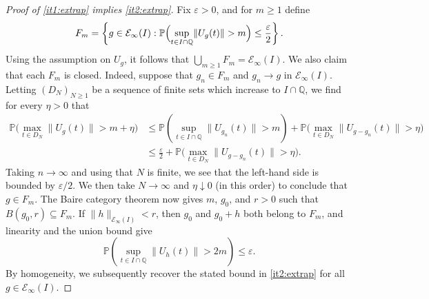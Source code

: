 \documentclass[11pt]{amsart}
\theoremstyle{definition}
\theoremstyle{remark}
\numberwithin{equation}{section}
\renewcommand{\P}{\mathbb P}
\newcommand{\Q}{\mathbb Q}
\newcommand{\1}{\mathbf 1}
\newcommand{\norm}[1]{\lVert #1\rVert}
\begin{document}
\begin{proof}[Proof of \ref{it1:extrap} implies \ref{it2:extrap}]
Fix $\varepsilon > 0$, and for $m \geq 1$ define
\[
 F_m=\left\{g\in\mathcal E_\infty(I):
  \P\Bigl(\sup_{t \in I \cap \Q} \norm{U_g(t)}>m \Bigr)\leq\frac\varepsilon2\right\}.
\]
Using the assumption on $U_g$, it follows that $\bigcup_{m \geq 1} F_m = \mathcal E_\infty(I)$.
We also claim that each \(F_m\) is closed.  Indeed, suppose that
\(g_n\in F_m\) and \(g_n\to g\) in \(\mathcal E_\infty(I)\). Letting $(D_N)_{N\geq 1}$ be a sequence of finite sets which increase to $I \cap \Q$, we find for every $\eta > 0$ that
\[
 \begin{split}
 \P\Big(
  \max_{t\in D_N}\norm{U_g(t)}>m+\eta
 \Big)
 &\leq
 \P(\sup_{t \in I \cap \Q} \norm{U_{g_n}(t)}>m)
 +\P\Big(
   \max_{t\in D_N}\norm{U_{g - g_n}(t)}>\eta
  \Big) \\
  &\leq
 \frac{\varepsilon}{2} +\P\Big(
   \max_{t\in D_N}\norm{U_{g - g_n}(t)}>\eta
  \Big).
 \end{split}
\]
Taking $n \to \infty$ and using that $N$ is finite, we see that the left-hand side is bounded by $\varepsilon / 2$.
We then take $N \to \infty$ and $\eta \downarrow 0$ (in this order) to conclude that $g \in F_m$.
The Baire category theorem now gives \(m\), \(g_0\), and \(r>0\) such that
\(B(g_0,r)\subseteq F_m\).  If
\(\norm{h}_{\mathcal E_\infty(I)}<r\), then \(g_0\) and \(g_0+h\) both
belong to \(F_m\), and linearity and the union bound give
\[
 \P(\sup_{t \in I \cap \Q} \norm{U_h(t)} > 2m)\leq\varepsilon.
\]
By homogeneity, we subsequently recover the stated bound in \ref{it2:extrap} for all $g \in \mathcal E_\infty(I)$.
\end{proof}
\end{document}
